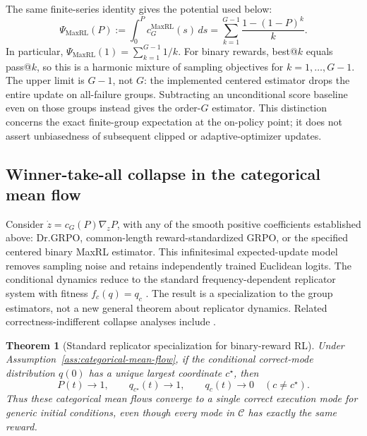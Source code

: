 \documentclass{article}
\newcommand{\enforcehalffinalproseline}{%
  \setlength{\parfillskip}{0pt plus .20\linewidth}}
\newcommand{\1}{\mathbf 1}
\newtheorem{theorem}[lemma]{Theorem}
\theoremstyle{remark}
\theoremstyle{definition}
\theoremstyle{plain}
\begin{document}
The same finite-series identity gives the potential used below:
\begin{equation}
 \Psi_{\mathrm{MaxRL}}(P)
 :=\int_0^P c_G^{\mathrm{MaxRL}}(s)\,ds
 =\sum_{k=1}^{G-1}\frac{1-(1-P)^k}{k}.
 \label{eq:maxrl-potential-finite-sum}
\end{equation}
In particular, $\Psi_{\mathrm{MaxRL}}(1)=\sum_{k=1}^{G-1}1/k$.
For binary rewards, best@\(k\) equals pass@\(k\), so this is a harmonic
mixture of sampling objectives for $k=1,\ldots,G-1$. The upper limit is
$G-1$, not $G$: the implemented centered estimator drops the entire update
on all-failure groups. Subtracting an unconditional score baseline even on
those groups instead gives the order-$G$ estimator. This distinction concerns
the exact finite-group expectation at the on-policy point; it does not assert
unbiasedness of subsequent clipped or adaptive-optimizer updates.


\subsection{Winner-take-all collapse in the categorical mean flow}
\label{app:theory-collapse}

Consider $\dot z=c_G(P)\nabla_zP$, with any of the smooth positive
coefficients established above: Dr.GRPO, common-length reward-standardized
GRPO, or the specified centered binary MaxRL estimator. This infinitesimal
expected-update model removes
sampling noise and retains independently trained Euclidean logits. The
conditional dynamics reduce to the standard frequency-dependent replicator
system with fitness $f_c(q)=q_c$ \citep{hofbauer1998evolutionary}. The result is
a specialization to the group estimators, not a new general theorem about
replicator dynamics. Related correctness-indifferent collapse analyses include
\citet{sinha2026expected,lochab2026ucpo}.

\begin{theorem}[Standard replicator specialization for binary-reward RL]
\enforcehalffinalproseline
\label{thm:grpo-collapse}
Under Assumption~\ref{ass:categorical-mean-flow}, if the conditional correct-mode
distribution $q(0)$ has a unique largest coordinate $c^\star$, then
\[
  P(t)\longrightarrow1,
  \qquad
  q_{c^\star}(t)\longrightarrow1,
  \qquad
  q_c(t)\longrightarrow0\quad(c\ne c^\star).
\]
Thus these categorical mean flows converge to a single correct execution
mode for generic initial conditions, even though every mode in $\mathcal C$
has exactly the same reward.
\end{theorem}
\end{document}

